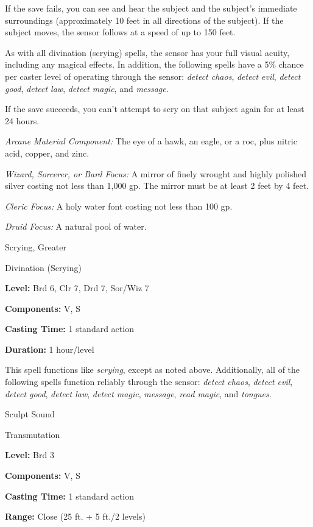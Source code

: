 \documentclass{article}
\begin{document}
If the save fails, you can see and hear the subject and the subject's immediate 
surroundings (approximately 10 feet in all directions of the subject). If the subject 
moves, the sensor follows at a speed of up to 150 feet.

As with all divination (scrying) spells, the sensor has your full visual acuity, 
including any magical effects. In addition, the following spells have a 5\% chance 
per caster level of operating through the sensor: \textit{detect chaos}, \textit{detect 
evil}, \textit{detect good}, \textit{detect law}, \textit{detect magic}, and \textit{message}.

If the save succeeds, you can't attempt to scry on that subject again for at least 
24 hours.

\textit{Arcane Material Component: }The eye of a hawk, an eagle, or a roc, plus 
nitric acid, copper, and zinc.

\textit{Wizard, Sorcerer, or Bard Focus: }A mirror of finely wrought and highly 
polished silver costing not less than 1,000 gp. The mirror must be at least 2 feet 
by 4 feet.

\textit{Cleric Focus: }A holy water font costing not less than 100 gp.

\textit{Druid Focus: }A natural pool of water. 

\vspace{12pt}
Scrying, Greater

Divination (Scrying)

\textbf{Level:} Brd 6, Clr 7, Drd 7, Sor/Wiz 7

\textbf{Components:} V, S

\textbf{Casting Time:} 1 standard action

\textbf{Duration:} 1 hour/level

This spell functions like \textit{scrying}, except as noted above. Additionally, 
all of the following spells function reliably through the sensor: \textit{detect 
chaos}, \textit{detect evil}, \textit{detect good}, \textit{detect law}, \textit{detect 
magic}, \textit{message}, \textit{read magic}, and \textit{tongues}.

\vspace{12pt}
Sculpt Sound

Transmutation

\textbf{Level:} Brd 3

\textbf{Components:} V, S

\textbf{Casting Time:} 1 standard action

\textbf{Range:} Close (25 ft. + 5 ft./2 levels)
\end{document}
